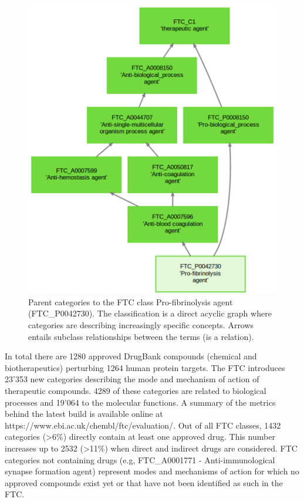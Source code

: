 \documentclass{bioinfo}
\begin{document}
\begin{figure}[!tpb]%
\centerline{\includegraphics{fig2.png}}
\caption{Parent categories to the FTC class Pro-fibrinolysis agent (FTC\_P0042730). The classification is a direct 
acyclic graph where categories are describing increasingly specific concepts. Arrows entails subclass relationships 
between the terms (is a relation).}\label{fig:02}
\end{figure}

In total there are 1280 approved DrugBank compounds (chemical and biotherapeutics) perturbing 1264 human protein targets. 
The FTC introduces 23'353 new categories describing the mode and mechanism of action of therapeutic compounds. 4289 of these 
categories are related to biological processes and 19'064 to the molecular functions. A summary of the metrics behind the latest 
build is available online at {{https://www.ebi.ac.uk/chembl/ftc/evaluation/}}. Out of all FTC classes, 1432 
categories (\textgreater 6\%) directly contain at least one approved drug. This number increases up to 2532 (\textgreater 11\%) 
when direct and 
indirect drugs are considered. FTC categories not containing drugs (e.g, FTC\_A0001771 - Anti-immunological synapse 
formation agent) represent modes and mechanisms of action for which no approved compounds exist yet or that have not been identified 
as such in the FTC.
\end{document}
